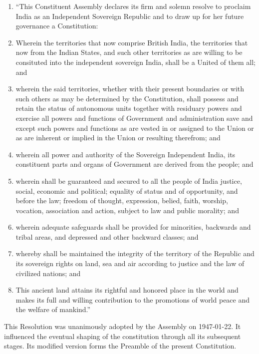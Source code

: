 \begin{multicol}{2}
\begin{enumerate}
  \item \textquotedblleft This Constituent Assembly declares its firm and solemn resolve to proclaim India as an Independent Sovereign Republic and to draw up for her future governance a Constitution:
  \item Wherein the territories that now comprise British India, the territories that now from the Indian States, and such other territories as are willing to be consituted into the independent sovereign India, shall be a United of them all; and
  \item wherein the said territories, whether with their present boundaries or with such others as may be determined by the Constitution, shall possess and retain the status of autonomous units together with residuary powers and exercise all powers and functions of Government and administration save and except such powers and functions as are vested in or assigned to the Union or as are inherent or implied in the Union or resulting therefrom; and
  \item wherein all power and authority of the Sovereign Independent India, its constituent parts and organs of Government are derived from the people; and
  \item wherein shall be guaranteed and secured to all the people of India justice, social, economic and political; equality of status and of opportunity, and before the law; freedom of thought, expression, belied, faith, worship, vocation, association and action, subject to law and public morality; and
  \item wherein adequate safeguards shall be provided for minorities, backwards and tribal areas, and depressed and other backward classes; and
  \item whereby shall be maintained the integrity of the territory of the Republic and its sovereign rights on land, sea and air according to justice and the law of civilized nations; and
  \item This ancient land attains its rightful and honored place in the world and makes its full and willing contribution to the promotions of world peace and the welfare of mankind.\textquotedblright

\end{enumerate}

This Resolution was unanimously adopted by the Assembly on 1947-01-22. It influenced the eventual shaping of the constitution through all its subsequent stages. Its modified version forms the Preamble of the present Constitution.


\end{multicol}
